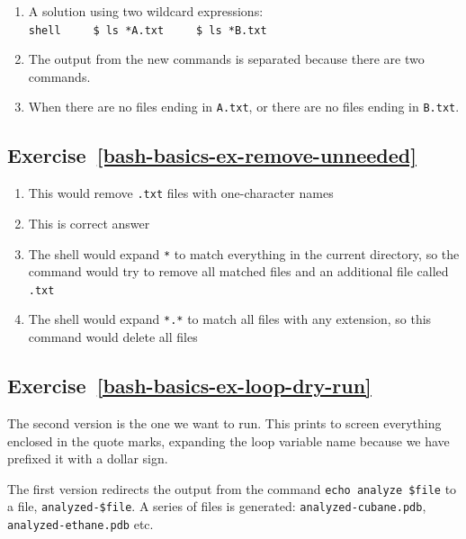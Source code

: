 \documentclass[
]{krantz}
\providecommand{\tightlist}{%
  \setlength{\itemsep}{0pt}\setlength{\parskip}{0pt}}
\begin{document}
\begin{enumerate}
\def\labelenumi{\arabic{enumi}.}
\tightlist
\item
  A solution using two wildcard expressions:
  \texttt{shell\ \ \ \ \ \$\ ls\ *A.txt\ \ \ \ \ \$\ ls\ *B.txt}
\item
  The output from the new commands is separated because there are two commands.
\item
  When there are no files ending in \texttt{A.txt}, or there are no files ending in
  \texttt{B.txt}.
\end{enumerate}

\hypertarget{exercise-refbash-basics-ex-remove-unneeded}{%
\subsection*{Exercise~\ref{bash-basics-ex-remove-unneeded}}\label{exercise-refbash-basics-ex-remove-unneeded}}


\begin{enumerate}
\def\labelenumi{\arabic{enumi}.}
\tightlist
\item
  This would remove \texttt{.txt} files with one-character names
\item
  This is correct answer
\item
  The shell would expand \texttt{*} to match everything in the current directory,
  so the command would try to remove all matched files and an additional
  file called \texttt{.txt}
\item
  The shell would expand \texttt{*.*} to match all files with any extension,
  so this command would delete all files
\end{enumerate}

\hypertarget{exercise-refbash-basics-ex-loop-dry-run}{%
\subsection*{Exercise~\ref{bash-basics-ex-loop-dry-run}}\label{exercise-refbash-basics-ex-loop-dry-run}}


The second version is the one we want to run.
This prints to screen everything enclosed in the quote marks, expanding the
loop variable name because we have prefixed it with a dollar sign.

The first version redirects the output from the command \texttt{echo\ analyze\ \$file} to
a file, \texttt{analyzed-\$file}. A series of files is generated: \texttt{analyzed-cubane.pdb},
\texttt{analyzed-ethane.pdb} etc.
\end{document}
